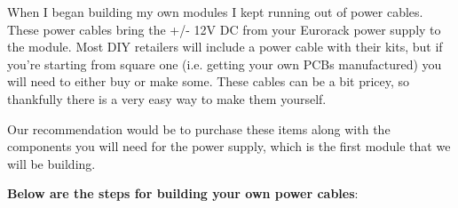 \documentclass{article}
\begin{document}
\noindent When I began building my own modules I kept running out of power cables. These power cables bring the +/- 12V DC from your Eurorack power supply to the module. Most DIY retailers will include a power cable with their kits, but if you're starting from square one (i.e. getting your own PCBs manufactured) you will need to either buy or make some. These cables can be a bit pricey, so thankfully there is a very easy way to make them yourself.\\
\newline
\begin{note}
Our recommendation would be to purchase these items along with the components you will need for the power supply, which is the first module that we will be building.
\end{note}
\vspace{0.8cm}
\noindent \textbf{Below are the steps for building your own power cables}:
\end{document}
